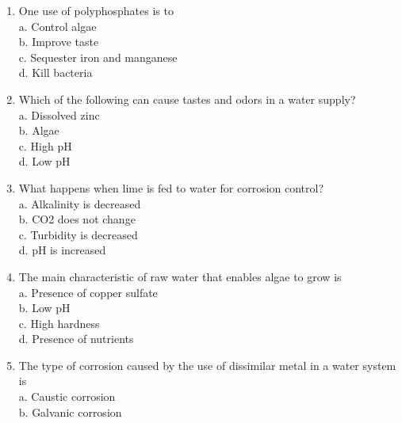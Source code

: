 \begin{enumerate}
\item One use of polyphosphates is to\\



a. Control algae\\

b. Improve taste\\

c. Sequester iron and manganese\\

d. Kill bacteria\\


\item Which of the following can cause tastes and odors in a water supply?\\
a. Dissolved zinc\\
b. Algae\\
c.  High pH\\
d.  Low pH\\

\item What happens when lime is fed to water for corrosion control?\\


a. Alkalinity is decreased\\

b. CO2 does not change\\

c. Turbidity is decreased\\

d.  pH is increased\\

\item The main characteristic of raw water that enables algae to grow is\\

a. Presence of copper sulfate\\

b. Low pH\\

c. High hardness\\

d. Presence of nutrients\\


\item The type of corrosion caused by the use of dissimilar metal in a water system is\\

a. Caustic corrosion\\

b. Galvanic corrosion\\


\end{enumerate}
